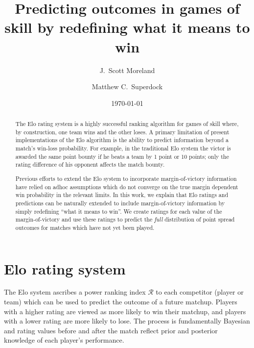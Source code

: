 \documentclass[aps,prc,reprint,amsmath,superscriptaddress]{revtex4-1}
\newcommand{\R}{\mathcal{R}}
\begin{document}
\title{Predicting outcomes in games of skill by redefining what it means to win}

\author{J.\ Scott Moreland}
\author{Matthew C.\ Superdock}

\date{\today}


\begin{abstract}
  The Elo rating system is a highly successful ranking algorithm for games of skill where, by construction, one team wins and the other loses.
  A primary limitation of present implementations of the Elo algorithm is the ability to predict information beyond a match's win-loss probability.
  For example, in the traditional Elo system the victor is awarded the same point bounty if he beats a team by 1 point or 10 points; only the rating difference of his opponent affects the match bounty.

Previous efforts to extend the Elo system to incorporate margin-of-victory information have relied on adhoc assumptions which do not converge on the true margin dependent win probability in the relevant limits.
  In this work, we explain that Elo ratings and predictions can be naturally extended to include margin-of-victory information by simply redefining ``what it means to win''.
  We create ratings for each value of the margin-of-victory and use these ratings to predict the \emph{full} distribution of point spread outcomes for matches which have not yet been played.
\end{abstract}


\maketitle

\section{Elo rating system}

The Elo system ascribes a power ranking index $\R$ to each competitor (player or team) which can be used to predict the outcome of a future matchup.
Players with a higher rating are viewed as more likely to win their matchup, and players with a lower rating are more likely to lose.
The process is fundamentally Bayesian and rating values before and after the match reflect prior and posterior knowledge of each player's performance.
\end{document}
